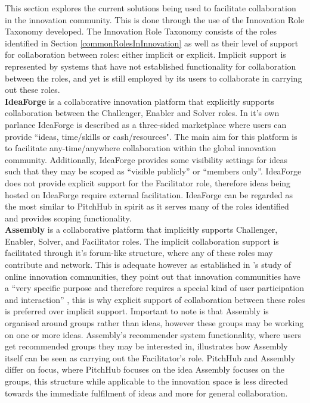 This section explores the current solutions being used to facilitate collaboration in the innovation community. This is done through the use of the Innovation Role Taxonomy developed. The Innovation Role Taxonomy consists of the roles identified in Section \ref{commonRolesInInnovation} as well as their level of support for collaboration between roles: either implicit or explicit. Implicit support is represented by systems that have not established functionality for collaboration between the roles, and yet is still employed by its users to collaborate in carrying out these roles.
\\
\newline
\textbf{IdeaForge} \cite{ideaForge:online}
is a collaborative innovation platform that explicitly supports collaboration between the Challenger, Enabler and Solver roles. In it's own parlance IdeaForge is described as a three-sided marketplace where users can provide ``ideas, time/skills or cash/resources". The main aim for this platform is to facilitate any-time/anywhere collaboration within the global innovation community. Additionally, IdeaForge provides some visibility settings for ideas such that they may be scoped as ``visible publicly'' or ``members only''. IdeaForge does not provide explicit support for the Facilitator role, therefore ideas being hosted on IdeaForge require external facilitation. IdeaForge can be regarded as the most similar to PitchHub in spirit as it serves many of the roles identified and provides scoping functionality.
\\
\newline
\textbf{Assembly} \cite{assembly:online}
is a collaborative platform that implicitly supports Challenger, Enabler, Solver, and Facilitator roles. The implicit collaboration support is facilitated through it's forum-like structure, where any of these roles may contribute and network. This is adequate however as established in \citeauthor{hautz2010establish}'s study of online innovation communities, they point out that innovation communities have a ``very specific purpose and therefore requires a special kind of user participation and interaction'' \cite{hautz2010establish}, this is why explicit support of collaboration between these roles is preferred over implicit support. Important to note is that Assembly is organised around groups rather than ideas, however these groups may be working on one or more ideas. Assembly's recommender system functionality, where users get recommended groups they may be interested in, illustrates how Assembly itself can be seen as carrying out the Facilitator's role. PitchHub and Assembly differ on focus, where PitchHub focuses on the idea Assembly focuses on the groups, this structure while applicable to the innovation space is less directed towards the immediate fulfilment of ideas and more for general collaboration.
